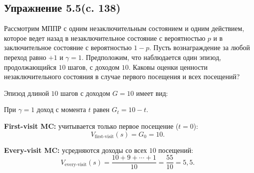 \subsection{Упражнение 5.5(c. 138)}
Рассмотрим МППР с одним незаключительным состоянием и одним действием, которое ведет назад в незаключительное состояние с вероятностью $p$ и в заключительное состояние с вероятностью $1 - p$. Пусть вознаграждение
за любой переход равно $+1$ и $\gamma = 1$. Предположим, что наблюдается один эпизод,
продолжающийся $10$ шагов, с доходом $10$. Каковы оценки ценности незаключительного состояния в случае первого посещения и всех посещений? 
\begin{solution}
    Эпизод длиной $10$ шагов с доходом $G = 10$ имеет вид:

    \begin{center}
    \end{center}

    При $\gamma = 1$ доход с момента $t$ равен $G_t = 10 - t$.

    \textbf{First-visit MC:} учитывается только первое посещение ($t = 0$):
    \[
    V_{\text{first-visit}}(s) = G_0 = 10.
    \]

    \textbf{Every-visit MC:} усредняются доходы со всех $10$ посещений:
    \[
    V_{\text{every-visit}}(s) = \frac{10 + 9 + \cdots + 1}{10} = \frac{55}{10} = 5{,}5.
    \]
\end{solution}

